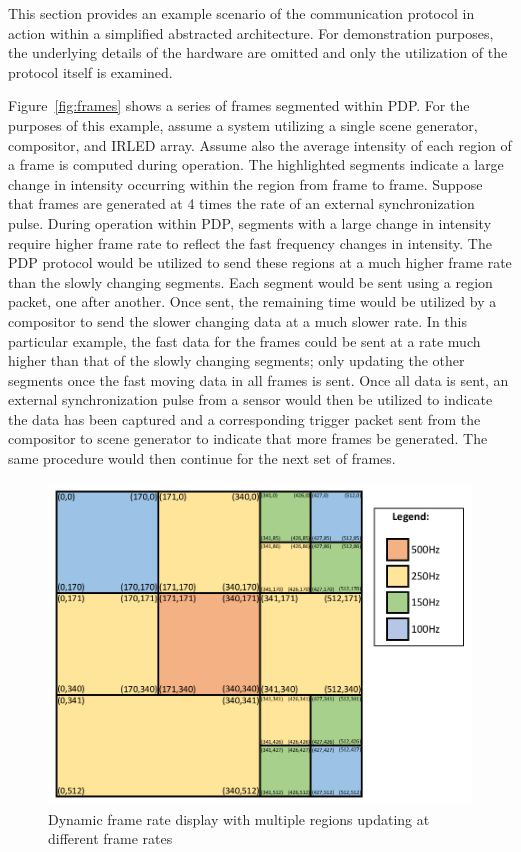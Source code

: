 This section provides an example scenario of the communication protocol in action within a simplified abstracted architecture. For demonstration purposes, the underlying details of the hardware are omitted and only the utilization of the protocol itself is examined.

Figure~\ref{fig:frames} shows a series of frames segmented within PDP. For the purposes of this example, assume a system utilizing a single scene generator, compositor, and IRLED array. Assume also the average intensity of each region of a frame is computed during operation. The highlighted segments indicate a large change in intensity occurring within the region from frame to frame. Suppose that frames are generated at 4 times the rate of an external synchronization pulse. During operation within PDP, segments with a large change in intensity require higher frame rate to reflect the fast frequency changes in intensity. The PDP protocol would be utilized to send these regions at a much higher frame rate than the slowly changing segments. Each segment would be sent using a region packet, one after another. Once sent, the remaining time would be utilized by a compositor to send the slower changing data at a much slower rate. In this particular example, the fast data for the frames could be sent at a rate much higher than that of the slowly changing segments; only updating the other segments once the fast moving data in all frames is sent. Once all data is sent, an external synchronization pulse from a sensor would then be utilized to indicate the data has been captured and a corresponding trigger packet sent from the compositor to scene generator to indicate that more frames be generated. The same procedure would then continue for the next set of frames.

\begin{figure}
        \centering
        \includegraphics[width=1.0\textwidth]{fig/variable_display.pdf}
        \caption{Dynamic frame rate display with multiple regions updating at different frame rates}
        \label{fig:variable_display}
\end{figure}

